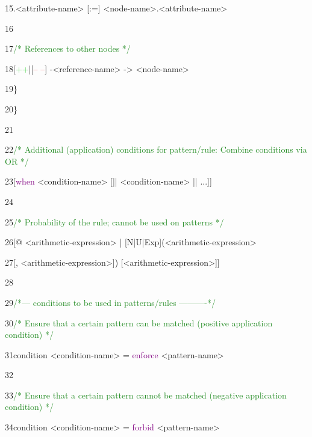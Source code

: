 {15\hspace{1.5cm}.<attribute-name> [:=] <node-name>.<attribute-name>

16

17\hspace{1.5cm}\textcolor{ForestGreen}{/* References to other nodes */}

18\hspace{1.5cm}[\textcolor{LimeGreen}{++}|[\textcolor{Red}{-- --}] -<reference-name> -> <node-name>

19\hspace{1cm}\}

20\hspace{0.5cm}\}

21

22\hspace{0.5cm}\textcolor{ForestGreen}{/* Additional (application) conditions for pattern/rule: Combine conditions via OR */}

23\hspace{0.5cm}[\textcolor{Purple}{when} <condition-name> [|| <condition-name> || ...]]

24

25\hspace{0.5cm}\textcolor{ForestGreen}{/* Probability of the rule; cannot be used on patterns */}

26\hspace{0.5cm}[@ <arithmetic-expression> | [N|U|Exp](<arithmetic-expression>

27\hspace{0.5cm}[, <arithmetic-expression>]) [<arithmetic-expression>]]

28

29\hspace{0.5cm}\textcolor{ForestGreen}{/*--- conditions to be used in patterns/rules ----------*/}

30\hspace{0.5cm}\textcolor{ForestGreen}{/* Ensure that a certain pattern can be matched (positive application condition) */}

31\hspace{0.5cm}condition <condition-name> = \textcolor{Purple}{enforce} <pattern-name>

32

33\hspace{0.5cm}\textcolor{ForestGreen}{/* Ensure that a certain pattern cannot be matched (negative application condition) */}

34\hspace{0.5cm}condition <condition-name> = \textcolor{Purple}{forbid} <pattern-name>

}
